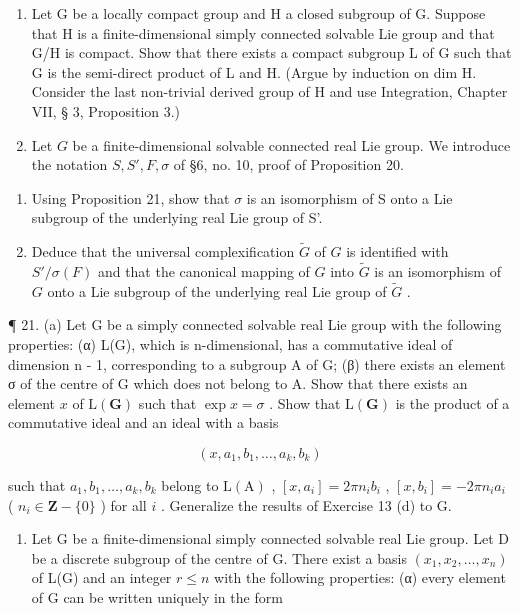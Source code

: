 \begin{enumerate}
\def\labelenumi{\arabic{enumi}.}
\setcounter{enumi}{18}
\item
  Let G be a locally compact group and H a closed subgroup of G. Suppose that H is a finite-dimensional simply connected solvable Lie group and that G/H is compact. Show that there exists a compact subgroup L of G such that G is the semi-direct product of L and H. (Argue by induction on dim H. Consider the last non-trivial derived group of H and use Integration, Chapter VII, § 3, Proposition 3.)
\item
  Let \(G\) be a finite-dimensional solvable connected real Lie group. We introduce the notation \(S, S', F, \sigma\) of §6, no. 10, proof of Proposition 20.
\end{enumerate}

\begin{enumerate}
\def\labelenumi{(\alph{enumi})}
\item
  Using Proposition 21, show that \(\sigma\) is an isomorphism of S onto a Lie subgroup of the underlying real Lie group of S'.
\item
  Deduce that the universal complexification \(\tilde{G}\) of \(G\) is identified with \(S' / \sigma(F)\) and that the canonical mapping of \(G\) into \(\tilde{G}\) is an isomorphism of \(G\) onto a Lie subgroup of the underlying real Lie group of \(\tilde{G}\) .
\end{enumerate}

¶ 21. (a) Let G be a simply connected solvable real Lie group with the following properties: (α) L(G), which is n-dimensional, has a commutative ideal of dimension n - 1, corresponding to a subgroup A of G; (β) there exists an element σ of the centre of G which does not belong to A. Show that there exists an element \(x\) of \(\mathrm{L}(\mathbf{G})\) such that \(\exp x = \sigma\) . Show that \(\mathrm{L}(\mathbf{G})\) is the product of a commutative ideal and an ideal with a basis

\[
(x, a _ {1}, b _ {1}, \dots , a _ {k}, b _ {k})
\]

such that \(a_1, b_1, \ldots, a_k, b_k\) belong to \(\mathrm{L}(\mathrm{A})\) , \([x, a_i] = 2\pi n_i b_i\) , \([x, b_i] = -2\pi n_i a_i\) ( \(n_i \in \mathbf{Z} - \{0\}\) ) for all \(i\) . Generalize the results of Exercise 13 (d) to G.

\begin{enumerate}
\def\labelenumi{(\alph{enumi})}
\setcounter{enumi}{1}
\tightlist
\item
  Let G be a finite-dimensional simply connected solvable real Lie group. Let D be a discrete subgroup of the centre of G. There exist a basis \((x_{1}, x_{2}, \ldots, x_{n})\) of L(G) and an integer \(r \leqslant n\) with the following properties: (α) every element of G can be written uniquely in the form
\end{enumerate}

